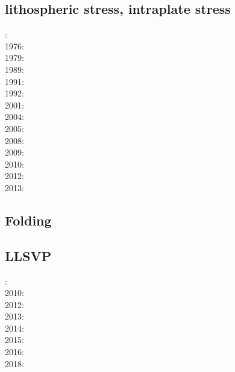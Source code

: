 \cite{baeg14}


\subsection*{lithospheric stress, intraplate stress}

: \cite{fouy75}\\
1976: \cite{riso76}\\
1979: \cite{riso79}\\
1989: \cite{boww89}\\
1991: \cite{worg91}\\
1992: \cite{rich92}\cite{wuvr92}\cite{zoba92}\cite{clko92}\\
2001: \cite{stsm01}\\
2004: \cite{ligu04}\\
2005: \cite{timr05}\\
2008: \cite{bilr08}\cite{ghhw08}\\
2009: \cite{ghhf09}\cite{nacl09}\\
2010: \cite{bepo10}\\
2012: \cite{nalr12}\cite{ghho12}\\
2013: \cite{ghhw13}


\subsection*{Folding}

\noindent
\cite{ramb68}
\cite{ramb70}
\cite{ramb71}
\cite{flet91}
\cite{frsc06}
\cite{resb10}
\cite{freh11}
\cite{reds12}
\cite{regc13}
\cite{freh14}\cite{frex14}


\subsection*{LLSVP}

: \cite{gamc08}\\
2010: \cite{stto10}\\
2012: \cite{stto12}\\
2013: \cite{limc13}\cite{bogs13a}\\
2014: \cite{budt14}\\
2015: \cite{musd15}\cite{hafg15}\\
2016: \cite{dost16}\\
2018: \cite{daga18}

